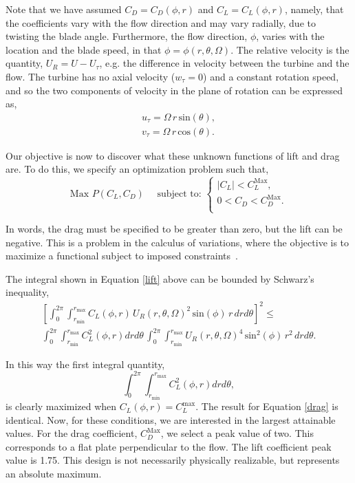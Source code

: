 Note that we have assumed $C_D = C_D(\phi,r)$ and $C_L = C_L(\phi,r)$,
namely, that the coefficients vary with the flow direction and may vary
radially, due to twisting the blade angle. Furthermore, the flow
direction, $\phi$, varies with the location and the blade speed,
in that $\phi=\phi(r,\theta,\Omega)$. The relative velocity is the
quantity, $U_R = U - U_\tau$, e.g. the difference in velocity between
the turbine and the flow. The turbine has no axial velocity ($w_\tau =
0$) and a constant rotation speed, and so the two components of velocity
in the plane of rotation can be expressed as,
\begin{align}
 u_\tau = \Omega \,r\, \text{sin}(\theta),\\
 v_\tau = \Omega \,r\, \text{cos}(\theta).
\end{align}

Our objective is now to discover what these unknown functions of lift
and drag are. To do this, we specify an optimization problem such that, 
\begin{equation*} 
 \text{Max } P(C_L,C_D) \quad \text{ subject to: }
  \begin{cases}
   |C_L| < C_L^{\text{Max}}, \\
   0 < C_D < C_D^{\text{Max}}. \\
  \end{cases}
\end{equation*}

In words, the drag must be specified to be greater than zero, but
the lift can be negative. This is a problem in the calculus of
variations, where the objective is to maximize a
functional subject to imposed
constraints~\cite{thornton2004classical,bradbury1968theoretical,2015JFM...784..565S}.   

%
%
The integral shown in Equation \ref{lift} above can be bounded by 
Schwarz's inequality,  
\begin{align*}
  \left[
    \int_0^{2\pi}
    \int_{r_{\text{min}}}^{r_{\text{max}}} C_L(\phi,r)\, U_R(r,\theta,\Omega)^2
 \,\text{sin}(\phi)\, r\,dr d\theta \right]^2 \le \\
  \int_0^{2\pi} \int_{r_{\text{min}}}^{r_{\text{max}}} C_L^2(\phi,r) dr d\theta\,
  \int_0^{2\pi} \int_{r_{\text{min}}}^{r_{\text{max}}} U_R(r,\theta,\Omega)^4 
 \,\text{sin}^2(\phi)\, r^2\,dr d\theta.
\end{align*}

In this way the first integral quantity,
\begin{equation}
  \int_0^{2\pi}
 \int_{r_{\text{min}}}^{r_{\text{max}}} C_L^2(\phi,r) dr d\theta, 
\end{equation}
is clearly maximized when $C_L(\phi,r) = C_L^{\text{max}}$. 
The result for Equation \ref{drag} is identical. Now, for these
conditions, we are interested in the largest attainable values. For the drag
coefficient, $C_D^{\text{Max}}$, we select a peak value of two. %
This corresponds to a flat plate perpendicular to the flow.
The lift coefficient peak value is 1.75. This design is not necessarily
physically realizable, but represents an absolute maximum. 

